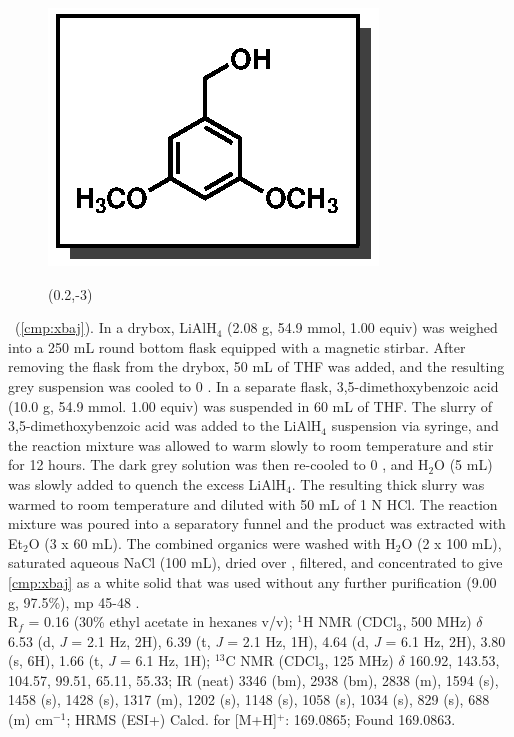 
\vspace{10pt}
\begin{figure}
  \vspace{-25pt}
  \begin{center}
    \includegraphics[scale=0.8]{chp_singlecarbon/images/xbaj}
    \begin{textblock}{1}(0.2,-3)  \end{textblock}
  \end{center}
  \vspace{-30pt}
\end{figure}\noindent \textbf{\CMPxbaj}\ (\ref{cmp:xbaj}). In a drybox, LiAlH$_4$ (2.08 g,
54.9 mmol, 1.00 equiv) was weighed into a 250 mL round bottom flask
equipped with a magnetic stirbar. After removing the flask from the drybox,
50 mL of THF was added, and the resulting grey suspension was cooled to
0 \degc. In a separate flask, 3,5-dimethoxybenzoic acid (10.0 g, 54.9 mmol. 1.00 equiv) was
suspended in 60 mL of THF. The slurry of 3,5-dimethoxybenzoic acid was added to the LiAlH$_4$
suspension via syringe, and the reaction mixture was allowed to warm slowly to room
temperature and stir for 12 hours. The dark grey solution was then re-cooled to 0 \degc, and H$_2$O
(5 mL) was slowly added to quench the excess LiAlH$_4$. The resulting thick slurry was warmed to
room temperature and diluted with 50 mL of 1 N HCl. The reaction mixture was poured into a
separatory funnel and the product was extracted with Et$_2$O (3 x 60 mL). The combined organics
were washed with H$_2$O (2 x 100 mL), saturated aqueous NaCl (100 mL), dried over ,
filtered, and concentrated to give \ref{cmp:xbaj} as a white solid that was used without any further
purification (9.00 g, 97.5\%), mp 45-48 \degc.\\
R$_f$ = 0.16 (30\% ethyl acetate in hexanes v/v); $^1$H NMR (CDCl$_3$, 500 MHz) $\delta$ 6.53 (d, \textit{J} = 2.1 Hz, 2H),
6.39 (t, \textit{J} = 2.1 Hz, 1H), 4.64 (d, \textit{J} = 6.1 Hz, 2H), 3.80 (s, 6H), 1.66 (t, \textit{J} = 6.1 Hz, 1H); $^{13}$C NMR
(CDCl$_3$, 125 MHz) $\delta$ 160.92, 143.53, 104.57, 99.51, 65.11, 55.33; IR (neat) 3346 (bm), 2938
(bm), 2838 (m), 1594 (s), 1458 (s), 1428 (s), 1317 (m), 1202 (s), 1148 (s), 1058 (s), 1034 (s), 829
(s), 688 (m) cm$^{-1}$; HRMS (ESI+) Calcd. for  [M+H]$^+$: 169.0865; Found 169.0863.

